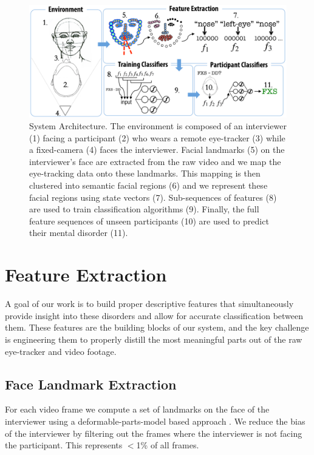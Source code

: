 \documentclass[10pt,twocolumn,letterpaper]{article}
\begin{document}
\begin{figure}[ht]   
\centering
           \includegraphics[width=\textwidth]{figures/system.png}           
 \caption{System Architecture. The environment is composed of an interviewer (1) facing a participant (2) who wears a remote eye-tracker (3) while a fixed-camera (4) faces the interviewer. Facial landmarks (5) on the interviewer's face are extracted from the raw video and we map the eye-tracking data onto these landmarks. This mapping is then clustered into semantic facial regions (6) and we represent these facial regions using state vectors (7). Sub-sequences of features (8) are used to train classification algorithms (9). Finally, the full feature sequences of  unseen participants (10) are used to predict their mental disorder (11).}
\label{fig:system_architecture}
\end{figure}

\section{Feature Extraction}
\label{sec:feature_extraction}
A goal of our work is to build proper descriptive features that simultaneously provide insight into these disorders and allow for accurate classification between them. These features are the building blocks of our system, and the key challenge is engineering them to properly distill the most meaningful parts out of the raw eye-tracker and video footage.  

\subsection{Face Landmark Extraction}
For each video frame we compute a set of landmarks on the face of the interviewer using a deformable-parts-model based approach \cite{dpmface}. We reduce the bias of the interviewer by filtering out the frames where the interviewer is not facing the participant. This represents $<$1\% of all frames.
\end{document}
